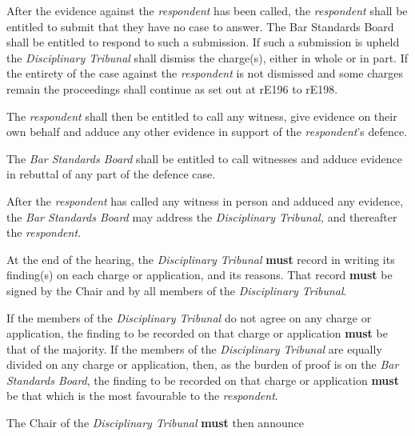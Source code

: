 After the evidence against the \emph{respondent} has been called,
the \emph{respondent} shall be entitled to submit that they have no case
to answer. The Bar Standards Board shall be entitled to respond to such
a submission. If such a submission is upheld the \emph{Disciplinary
Tribunal} shall dismiss the charge(s), either in whole or in part. If
the entirety of the case against the \emph{respondent} is not dismissed
and some charges remain the proceedings shall continue as set out at
rE196 to rE198.\\
\par
The \emph{respondent} shall then be entitled to call any witness, give
evidence on their own behalf and adduce any other evidence in support of
the \emph{respondent}'s defence.\\
\par
The \emph{Bar Standards Board }shall be entitled to call witnesses and
adduce evidence in rebuttal of any part of the defence case.\\
\par
After the \emph{respondent }has called any witness in person and adduced
any evidence, the \emph{Bar Standards Board }may address
the \emph{Disciplinary Tribunal, }and thereafter
the \emph{respondent.}\par
{}\par
{}
At the end of the hearing, the \emph{Disciplinary Tribunal}  \textcolor{myred}{\textbf{must}} record
in writing its finding(s) on each charge or application, and its
reasons. That record  \textcolor{myred}{\textbf{must}} be signed by the Chair and by all members of
the \emph{Disciplinary Tribunal}.\\
\par
If the members of the \emph{Disciplinary Tribunal} do not agree on any
charge or application, the finding to be recorded on that charge or
application  \textcolor{myred}{\textbf{must}} be that of the majority. If the members of
the \emph{Disciplinary Tribunal} are equally divided on any charge or
application, then, as the burden of proof is on the \emph{Bar Standards
Board}, the finding to be recorded on that charge or application  \textcolor{myred}{\textbf{must}} be
that which is the most favourable to the \emph{respondent}.\\
\par
The Chair of the\emph{ Disciplinary Tribunal}  \textcolor{myred}{\textbf{must}} then announce
